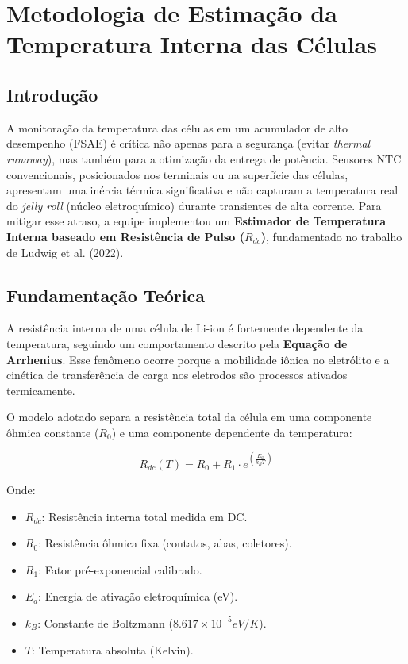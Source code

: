 \section{Metodologia de Estimação da Temperatura Interna das Células}

\subsection{Introdução}
A monitoração da temperatura das células em um acumulador de alto desempenho (FSAE) é crítica não apenas para a segurança (evitar \textit{thermal runaway}), mas também para a otimização da entrega de potência. Sensores NTC convencionais, posicionados nos terminais ou na superfície das células, apresentam uma inércia térmica significativa e não capturam a temperatura real do \textit{jelly roll} (núcleo eletroquímico) durante transientes de alta corrente. Para mitigar esse atraso, a equipe implementou um \textbf{Estimador de Temperatura Interna baseado em Resistência de Pulso ($R_{dc}$)}, fundamentado no trabalho de Ludwig et al. (2022).

\subsection{Fundamentação Teórica}
A resistência interna de uma célula de Li-ion é fortemente dependente da temperatura, seguindo um comportamento descrito pela \textbf{Equação de Arrhenius}. Esse fenômeno ocorre porque a mobilidade iônica no eletrólito e a cinética de transferência de carga nos eletrodos são processos ativados termicamente.

O modelo adotado separa a resistência total da célula em uma componente ôhmica constante ($R_0$) e uma componente dependente da temperatura:

\begin{equation}
R_{dc}(T) = R_0 + R_1 \cdot e^{\left(\frac{E_a}{k_B T}\right)}
\end{equation}

Onde:
\begin{itemize}
    \item $R_{dc}$: Resistência interna total medida em DC.
    \item $R_0$: Resistência ôhmica fixa (contatos, abas, coletores).
    \item $R_1$: Fator pré-exponencial calibrado.
    \item $E_a$: Energia de ativação eletroquímica (eV).
    \item $k_B$: Constante de Boltzmann ($8.617 \times 10^{-5} eV/K$).
    \item $T$: Temperatura absoluta (Kelvin).
\end{itemize}

